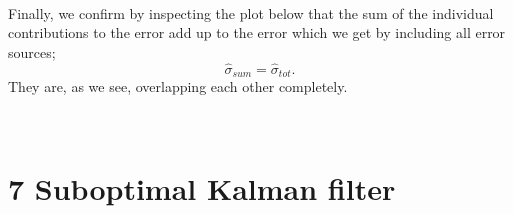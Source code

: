\documentclass[11pt]{article}
\begin{document}
    \begin{center}
    \end{center}
    { \hspace*{\fill} \\}
    
    Finally, we confirm by inspecting the plot below that the sum of the
individual contributions to the error add up to the error which we get
by including all error sources; \[
\hat{\sigma}_{sum} = \hat{\sigma}_{tot}.
\] They are, as we see, overlapping each other completely.


    \begin{center}
    \end{center}
    { \hspace*{\fill} \\}
    
    \hypertarget{suboptimal-kalman-filter}{%
\section*{7 Suboptimal Kalman filter}\label{suboptimal-kalman-filter}}
\end{document}
